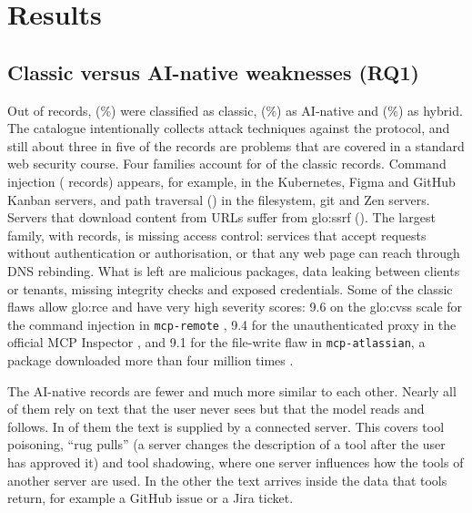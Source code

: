 \chapter{Results}

\section{Classic versus AI-native weaknesses (RQ1)}

\par Out of \nRecords{} records, \nClassic{} (\pClassic\%) were classified as classic, \nNative{} (\pNative\%) as AI-native and \nHybrid{} (\pHybrid\%) as hybrid. The catalogue intentionally collects attack techniques against the protocol, and still about three in five of the records are problems that are covered in a standard web security course. Four families account for \nMainFamilies{} of the \nClassic{} classic records. Command injection (\nCommandInjection{} records) appears, for example, in the Kubernetes, Figma and GitHub Kanban servers, and path traversal (\nPathTraversal{}) in the filesystem, git and Zen servers. Servers that download content from URLs suffer from \acrfull{glo:ssrf} (\nSsrf{}). The largest family, with \nAccessControl{} records, is missing access control: services that accept requests without authentication or authorisation, or that any web page can reach through DNS rebinding. What is left are malicious packages, data leaking between clients or tenants, missing integrity checks and exposed credentials. Some of the classic flaws allow \acrfull{glo:rce} and have very high severity scores: 9.6 on the \acrshort{glo:cvss} scale for the command injection in \texttt{mcp-remote} \cite{jfrog2025}, 9.4 for the unauthenticated proxy in the official MCP Inspector \cite{oligo2025}, and 9.1 for the file-write flaw in \texttt{mcp-atlassian}, a package downloaded more than four million times \cite{pluto2026}.

\par The AI-native records are fewer and much more similar to each other. Nearly all of them rely on text that the user never sees but that the model reads and follows. In \nNativeViaServer{} of them the text is supplied by a connected server. This covers tool poisoning, ``rug pulls'' (a server changes the description of a tool after the user has approved it) and tool shadowing, where one server influences how the tools of another server are used. In the other \nNativeViaContent{} the text arrives inside the data that tools return, for example a GitHub issue or a Jira ticket.

